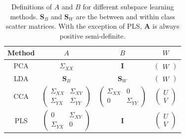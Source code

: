 \begin{table}[h]
    \centering
    \begin{tabular}{|c|c|c|c|}
        \hline
        Method & $A$                                                                                    & $B$                                                                & $W$                                    \\
        \hline
        PCA    & $\Sigma_{XX}$                                                                          & $\mathbf{I}$                                                       & $\begin{pmatrix}W\end{pmatrix}$        \\
        \hline
        LDA    & $\mathbf{S}_B$                                                                         & $\mathbf{S}_W$                                                     & $\begin{pmatrix}W\end{pmatrix}$        \\
        \hline
        CCA    & $\begin{pmatrix} \Sigma_{XX} & \Sigma_{XY} \\ \Sigma_{YX} & \Sigma_{YY} \end{pmatrix}$ & $\begin{pmatrix} \Sigma_{XX} & 0 \\ 0 & \Sigma_{YY} \end{pmatrix}$ & $\begin{pmatrix} U \\ V \end{pmatrix}$ \\
        \hline
        PLS    & $\begin{pmatrix} 0 & \Sigma_{XY} \\ \Sigma_{YX} & 0 \end{pmatrix}$                     & $\mathbf{I}$                                                       & $\begin{pmatrix} U \\ V \end{pmatrix}$ \\
        \hline
    \end{tabular}
    \caption{Definitions of $A$ and $B$ for different subspace learning methods. $\mathbf{S}_B$ and $\mathbf{S}_W$ are the between and within class scatter matrices. With the exception of PLS, $\textbf{A}$ is always positive semi-definite.}
    \label{tab:subspace}
\end{table}

